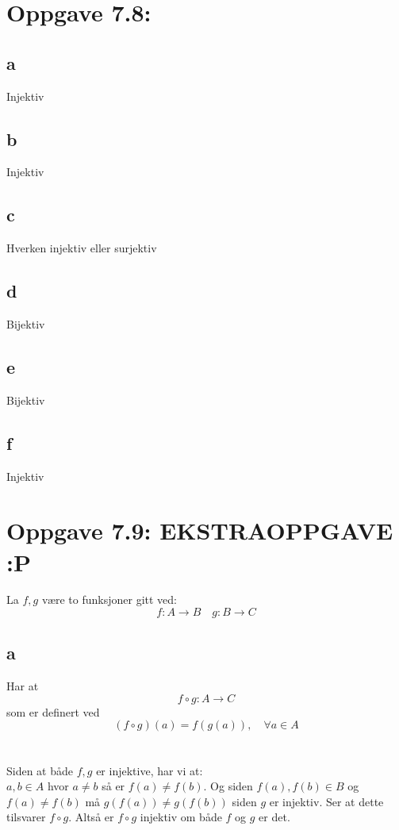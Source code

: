 \documentclass[a4paper, norsk, 10pt]{article}
\begin{document}
\begin{flushleft}
\newpage

\section*{Oppgave 7.8:}
\subsection*{a} Injektiv
\subsection*{b} Injektiv
\subsection*{c} Hverken injektiv eller surjektiv
\subsection*{d} Bijektiv
\subsection*{e} Bijektiv
\subsection*{f} Injektiv


\section*{Oppgave 7.9: EKSTRAOPPGAVE :P}
La $f, g$ være to funksjoner gitt ved: \[f: A \rightarrow B \quad g: B \rightarrow C \]

\subsection*{a}

Har at \[f \circ g: A \rightarrow C \] som er definert ved
\[(f \circ g) (a) = f(g(a)), \quad \forall a \in A\] \\
\ \\
Siden at både $f, g$ er injektive, har vi at: \\
$a,b \in A$ hvor $ a \neq b$ så er $f(a) \neq f (b)$. Og siden $f(a), f(b) \in B$ og $f(a) \neq f(b)$ må $g(f(a)) \neq g(f(b))$ siden $g$ er injektiv. Ser at dette tilsvarer $f \circ g$. Altså er $f \circ g$ injektiv om både $f$ og $g$ er det.  \\


\end{flushleft}
\end{document}
